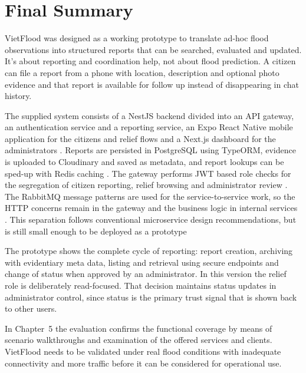 \titlespacing*{\section}{0pt}{0.8em}{0.45em} \section{Final Summary}
VietFlood was designed as a working prototype to translate ad-hoc flood observations into structured reports that can be searched, evaluated and updated. It’s about reporting and coordination help, not about flood prediction. A citizen can file a report from a phone with location, description and optional photo evidence and that report is available for follow up instead of disappearing in chat history.

The supplied system consists of a NestJS backend divided into an API gateway, an authentication service and a reporting service, an Expo React Native mobile application for the citizens and relief flows and a Next.js dashboard for the administrators \cite{nestjsDocs,expoDocs,nextjsDocs}. Reports are persisted in PostgreSQL using TypeORM, evidence is uploaded to Cloudinary and saved as metadata, and report lookups can be sped-up with Redis caching \cite{typeormDocs,cloudinaryUploadDocs,redisDocs}. The gateway performs JWT based role checks for the segregation of citizen reporting, relief browsing and administrator review \cite{jones2015jwt}. The RabbitMQ message patterns are used for the service-to-service work, so the HTTP concerns remain in the gateway and the business logic in internal services \cite{rabbitmqConfirmsDocs,nestjsMicroservicesDocs}. This separation follows conventional microservice design recommendations, but is still small enough to be deployed as a prototype \cite{fowlerLewis2014microservices,dragoni2017microservices,thones2015microservices}

The prototype shows the complete cycle of reporting: report creation, archiving with evidentiary meta data, listing and retrieval using secure endpoints and change of status when approved by an administrator. In this version the relief role is deliberately read-focused. That decision maintains status updates in administrator control, since status is the primary trust signal that is shown back to other users.

In Chapter~5 the evaluation confirms the functional coverage by means of scenario walkthroughs and examination of the offered services and clients. VietFlood needs to be validated under real flood conditions with inadequate connectivity and more traffic before it can be considered for operational use.

